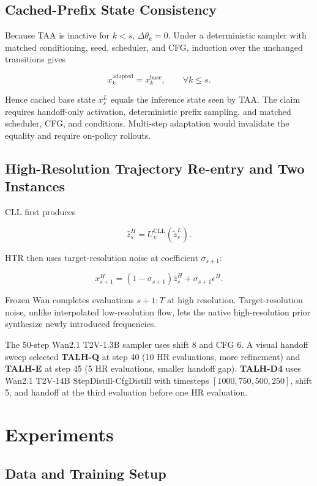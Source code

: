 \subsection{Cached-Prefix State Consistency}
\label{sec:cached}

Because TAA is inactive for \(k<s\), \(\Delta\theta_k=0\). Under a deterministic sampler with matched conditioning, seed, scheduler, and CFG, induction over the unchanged transitions gives

\[
x_k^{\mathrm{adapted}}=x_k^{\mathrm{base}},
\qquad \forall k\leq s.
\]

Hence cached base state \(x_s^L\) equals the inference state seen by TAA. The claim requires handoff-only activation, deterministic prefix sampling, and matched scheduler, CFG, and conditions. Multi-step adaptation would invalidate the equality and require on-policy rollouts.

\subsection{High-Resolution Trajectory Re-entry and Two Instances}

CLL first produces

\[
\widehat z_s^H=U_\psi^{\mathrm{CLL}}(\widetilde z_s^L).
\]

HTR then uses target-resolution noise at coefficient \(\sigma_{s+1}\):

\[
x_{s+1}^H
=(1-\sigma_{s+1})\widehat z_s^H
+\sigma_{s+1}\epsilon^H.
\]

Frozen Wan completes evaluations \(s+1{:}T\) at high resolution. Target-resolution noise, unlike interpolated low-resolution flow, lets the native high-resolution prior synthesize newly introduced frequencies.

The 50-step Wan2.1 T2V-1.3B sampler uses shift 8 and CFG 6. A visual handoff sweep selected \textbf{TALH-Q} at step 40 (10 HR evaluations, more refinement) and \textbf{TALH-E} at step 45 (5 HR evaluations, smaller handoff gap). \textbf{TALH-D4} uses Wan2.1 T2V-14B StepDistill-CfgDistill with timesteps \([1000,750,500,250]\), shift 5, and handoff at the third evaluation before one HR evaluation.

\section{Experiments}

\subsection{Data and Training Setup}

